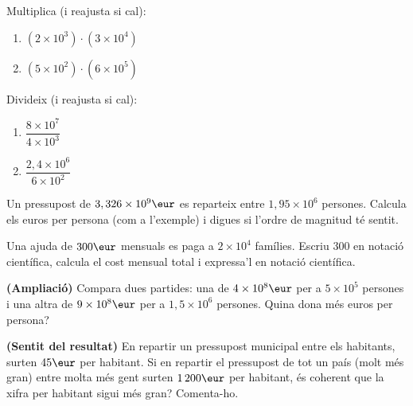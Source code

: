 \begin{exercicis}
\begin{exlist}
  \item Multiplica (i reajusta si cal):
        \begin{enumerate}[label=\alph*), leftmargin=1.6em, topsep=2pt]
          \item $(2\times 10^{3})\cdot(3\times 10^{4})$
          \item $(5\times 10^{2})\cdot(6\times 10^{5})$
        \end{enumerate}
  \item Divideix (i reajusta si cal):
        \begin{enumerate}[label=\alph*), leftmargin=1.6em, topsep=2pt]
          \item $\dfrac{8\times 10^{7}}{4\times 10^{3}}$
          \item $\dfrac{2,4\times 10^{6}}{6\times 10^{2}}$
        \end{enumerate}
  \item Un pressupost de $3,326\times 10^{9}\eur$ es reparteix entre $1,95\times 10^{6}$
        persones. Calcula els euros per persona (com a l'exemple) i digues si l'ordre
        de magnitud té sentit.
  \item Una ajuda de $300\eur$ mensuals es paga a $2\times 10^{4}$ famílies. Escriu
        $300$ en notació científica, calcula el cost mensual total i expressa'l en
        notació científica.
  \item \textbf{(Ampliació)} Compara dues partides: una de $4\times 10^{8}\eur$ per a
        $5\times 10^{5}$ persones i una altra de $9\times 10^{8}\eur$ per a
        $1,5\times 10^{6}$ persones. Quina dona més euros per persona?
  \item \textbf{(Sentit del resultat)} En repartir un pressupost municipal entre els
        habitants, surten $45\eur$ per habitant. Si en repartir el pressupost de tot un
        país (molt més gran) entre molta més gent surten $1\,200\eur$ per habitant,
        és coherent que la xifra per habitant sigui més gran? Comenta-ho.
\end{exlist}
\end{exercicis}

